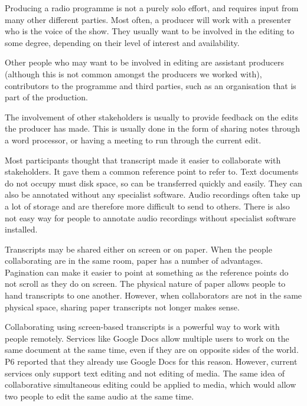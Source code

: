 
Producing a radio programme is not a purely solo effort, and requires input from many other different parties. Most
often, a producer will work with a presenter who is the voice of the show. They usually want to be involved in the
editing to some degree, depending on their level of interest and availability.

Other people who may want to be involved in editing are assistant producers (although this is not common amongst the
producers we worked with), contributors to the programme and third parties, such as an organisation that is part of the
production.

The involvement of other stakeholders is usually to provide feedback on the edits the producer has made. This is
usually done in the form of sharing notes through a word processor, or having a meeting to run through the current
edit.


Most participants thought that transcript made it easier to collaborate with stakeholders. It gave them a common
reference point to refer to. Text documents do not occupy must disk space, so can be transferred quickly and easily.
They can also be annotated without any specialist software. Audio recordings often take up a lot of storage and are
therefore more difficult to send to others. There is also not easy way for people to annotate audio recordings without
specialist software installed.


Transcripts may be shared either on screen or on paper. When the people collaborating are in the same room, paper has a
number of advantages. Pagination can make it easier to point at something as the reference points do not scroll as they
do on screen. The physical nature of paper allows people to hand transcripts to one another. However, when
collaborators are not in the same physical space, sharing paper transcripts not longer makes sense.


Collaborating using screen-based transcripts is a powerful way to work with people remotely. Services like Google Docs
allow multiple users to work on the same document at the same time, even if they are on opposite sides of the world. P6
reported that they already use Google Docs for this reason. However, current services only support text editing and not
editing of media. The same idea of collaborative simultaneous editing could be applied to media, which would allow two
people to edit the same audio at the same time.

